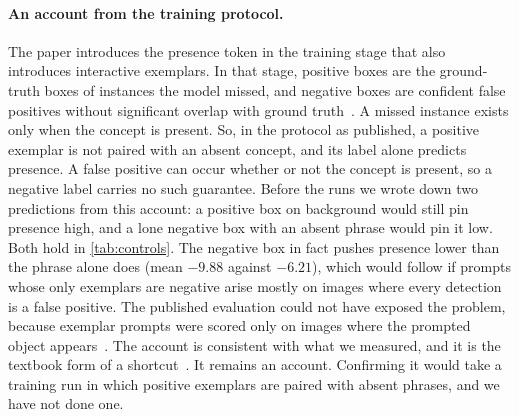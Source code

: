\paragraph{An account from the training protocol.}
The \sam{} paper introduces the presence token in the training stage that also introduces interactive exemplars.
In that stage, positive boxes are the ground-truth boxes of instances the model missed, and negative boxes are confident false positives without significant overlap with ground truth~\cite{carion2026sam3}.
A missed instance exists only when the concept is present.
So, in the protocol as published, a positive exemplar is not paired with an absent concept, and its label alone predicts presence.
A false positive can occur whether or not the concept is present, so a negative label carries no such guarantee.
Before the runs we wrote down two predictions from this account: a positive box on background would still pin presence high, and a lone negative box with an absent phrase would pin it low.
Both hold in \cref{tab:controls}.
The negative box in fact pushes presence lower than the phrase alone does (mean $-9.88$ against $-6.21$), which would follow if prompts whose only exemplars are negative arise mostly on images where every detection is a false positive.
The published evaluation could not have exposed the problem, because exemplar prompts were scored only on images where the prompted object appears~\cite{carion2026sam3}.
The account is consistent with what we measured, and it is the textbook form of a shortcut~\cite{geirhos2020shortcut}.
It remains an account.
Confirming it would take a training run in which positive exemplars are paired with absent phrases, and we have not done one.
